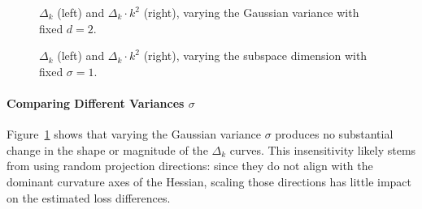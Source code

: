 \documentclass{article}
\begin{document}
\begin{figure}[!htbp]
  \hspace*{-2.6cm}
  \caption{$\Delta_k$ (left) and $\Delta_k \cdot k^2$ (right), varying the Gaussian variance with fixed $d = 2$.}
  \label{fig:delta_random_sigma}
\end{figure}

\begin{figure}[!htbp]
  \hspace*{-2.6cm}
  \caption{$\Delta_k$ (left) and $\Delta_k \cdot k^2$ (right), varying the subspace dimension with fixed $\sigma = 1$.}
  \label{fig:delta_random_dim}
\end{figure}

\paragraph{Comparing Different Variances \texorpdfstring{$\sigma$}{sigma}}
Figure~\ref{fig:delta_random_sigma} shows that varying the Gaussian variance $\sigma$ produces no substantial change in the shape or
magnitude of the $\Delta_k$ curves. This insensitivity likely stems from using random projection directions: since they do not align
with the dominant curvature axes of the Hessian, scaling those directions has little impact on the estimated loss differences.
\end{document}
